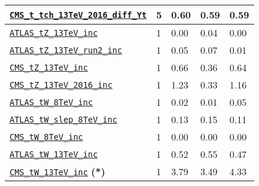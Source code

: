 \begin{table}[htbp]
\begin{tabular}{l|C{1.1cm}|C{2.1cm}|C{2.5cm}|C{2.5cm}}
 \href{https://arxiv.org/abs/1907.08330}{\tt CMS\_t\_tch\_13TeV\_2016\_diff\_Yt} & 5 &  0.60  & 0.59  & 0.59      \\
\midrule
 \href{https://arxiv.org/abs/1712.02825}{\tt ATLAS\_tZ\_13TeV\_inc} & 1 &  0.00     & 0.04     &  0.00    \\
 \href{https://arxiv.org/abs/2002.07546}{\tt ATLAS\_tZ\_13TeV\_run2\_inc} & 1 &  0.05    &  0.07    &  0.01    \\
 \href{https://arxiv.org/abs/1712.02825}{\tt CMS\_tZ\_13TeV\_inc} & 1 &  0.66    & 0.36     & 0.64     \\
 \href{https://arxiv.org/abs/1812.05900}{\tt CMS\_tZ\_13TeV\_2016\_inc} & 1 &   1.23    &  0.33    &  1.16    \\
 \href{https://arxiv.org/abs/1510.03752}{\tt ATLAS\_tW\_8TeV\_inc} & 1 &  0.02     &  0.01    &  0.05    \\
 \href{https://arxiv.org/abs/2007.01554}{\tt ATLAS\_tW\_slep\_8TeV\_inc} & 1 &   0.13    &  0.15    & 0.11    \\
 \href{https://arxiv.org/abs/1401.2942}{\tt CMS\_tW\_8TeV\_inc} & 1 &  0.00     & 0.00     & 0.00     \\
 \href{https://arxiv.org/abs/1612.07231}{\tt ATLAS\_tW\_13TeV\_inc} & 1 &  0.52     &  0.55    &  0.47    \\
 \href{https://arxiv.org/abs/1805.07399}{\tt CMS\_tW\_13TeV\_inc}  {{\bf (*)}} & 1 &  3.79     & 3.49     &  4.33    \\

\end{tabular}
\end{table}
